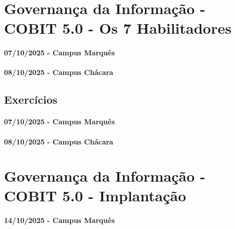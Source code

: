 \documentclass[
]{book}
\begin{document}
\chapter{Governança da Informação - COBIT 5.0 - Os 7 Habilitadores}\label{governanuxe7a-da-informauxe7uxe3o---cobit-5.0---os-7-habilitadores}

\subsubsection*{07/10/2025 - Campus Marquês}\label{campus-marquuxeas-10}

\subsubsection*{08/10/2025 - Campus Chácara}\label{campus-chuxe1cara-10}

\section{Exercícios}\label{exercuxedcios-7}

\subsubsection*{07/10/2025 - Campus Marquês}\label{campus-marquuxeas-11}

\subsubsection*{08/10/2025 - Campus Chácara}\label{campus-chuxe1cara-11}

\chapter{Governança da Informação - COBIT 5.0 - Implantação}\label{governanuxe7a-da-informauxe7uxe3o---cobit-5.0---implantauxe7uxe3o}

\subsubsection*{14/10/2025 - Campus Marquês}\label{campus-marquuxeas-12}
\end{document}
